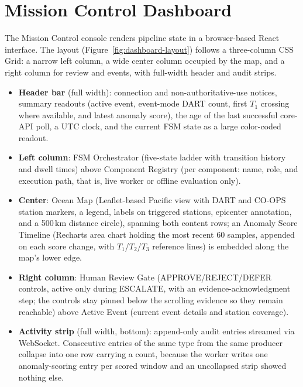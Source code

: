 \documentclass{article}
\begin{document}
\section{Mission Control Dashboard}
\label{sec:appendix-dashboard}

The Mission Control console renders pipeline state in a
browser-based React interface.  The layout
(Figure~\ref{fig:dashboard-layout}) follows a three-column CSS Grid:
a narrow left column, a wide center column occupied by the map, and a
right column for review and events, with full-width header and audit
strips.

\begin{itemize}[nosep]
  \item \textbf{Header bar} (full width): connection and
    non-authoritative-use notices, summary readouts (active event,
    event-mode DART count, first $T_1$ crossing where available, and
    latest anomaly score), the age of the last successful core-API poll,
    a UTC clock, and the current FSM state as a large color-coded readout.
  \item \textbf{Left column}: FSM Orchestrator (five-state ladder with
    transition history and dwell times) above Component Registry (per
    component: name, role, and execution path, that is, live worker or
    offline evaluation only).
  \item \textbf{Center}: Ocean Map (Leaflet-based Pacific view with
    DART and CO-OPS station markers, a legend, labels on triggered
    stations, epicenter annotation, and a 500\,km distance circle),
    spanning both content rows; an Anomaly Score Timeline (Recharts
    area chart holding the most recent 60 samples, appended on each
    score change, with $T_1$/$T_2$/$T_3$
    reference lines) is embedded along the map's lower edge.
  \item \textbf{Right column}: Human Review Gate
    (APPROVE/REJECT/DEFER controls, active only during ESCALATE, with
    an evidence-acknowledgment step; the controls stay pinned below the
    scrolling evidence so they remain reachable) above Active Event
    (current event details and station coverage).
  \item \textbf{Activity strip} (full width, bottom): append-only audit
    entries streamed via WebSocket. Consecutive entries of the same type
    from the same producer collapse into one row carrying a count, because
    the worker writes one anomaly-scoring entry per scored window and an
    uncollapsed strip showed nothing else.
\end{itemize}
\end{document}
